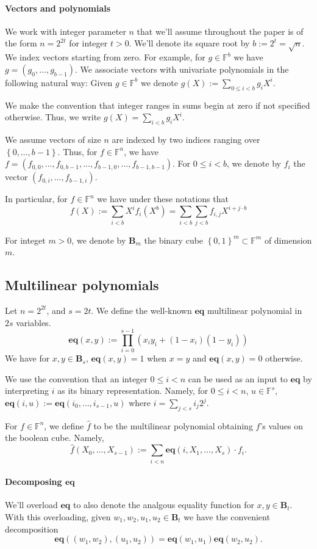 \documentclass[11pt]{article} %
\newcommand{\F}{\ensuremath{\mathbb F}\xspace}
\newcommand{\defeq}{:=}
\newcommand{\set}[1]{\ensuremath{\left\{#1\right\}}\xspace}
\newcommand{\sumi}[1]{\sum_{i< #1}}
\newcommand{\sumj}[1]{\sum_{j< #1}}
\newcommand{\eq}{\ensuremath{\mathsf{eq}}\xspace}
\renewcommand{\eq}{\ensuremath{\mathbf{eq}}\xspace}
\newcommand{\mle}[1]{\ensuremath{\hat{#1}}\xspace}
\newcommand{\B}[1]{\ensuremath{\mathbf{B}_{#1}}\xspace}
\begin{document}
\paragraph{Vectors and polynomials}
We work with integer parameter $n$ that we'll assume throughout the paper  is of the form
$n=2^{2t}$ for integer $t>0$. We'll denote its square root by $b\defeq 2^t=\sqrt{n}$.
We index vectors starting from zero. For example, for $g\in \F^b$ we have $g=(g_0,\ldots,g_{b-1})$.
We associate vectors with univariate polynomials in the following natural way:
Given $g\in \F^b$ we denote $g(X)\defeq \sum_{0\leq i < b} g_i X^i$.

We make the convention that integer ranges in sums begin at zero if not specified otherwise. Thus, we write
$g(X)=\sumi{b}g_i X^i$.

We assume vectors of size $n$ are indexed by two indices ranging over $\set{0,\ldots,b-1}$. Thus, for $f\in \F^n$, we have $f=(f_{0,0},\ldots,f_{0,b-1},\ldots,f_{b-1,0},\ldots,f_{b-1,b-1})$.
 For $0\leq i <b$, we denote by $f_i$ the vector $(f_{0,i},\ldots, f_{b-1,i})$.

In particular, for $f\in \F^n$ we have under these notations that
\[f(X)\defeq \sumi{b}X^i f_i(X^b) = \sumi{b}\sumj{b}f_{i,j}X^{i+j\cdot b}\]
 
For integet $m>0$, we denote by \B{m} the binary cube $\set{0,1}^m\subset \F^m$ of dimension $m$.
\subsection{Multilinear polynomials}\label{sec:multilin-polys}
Let $n=2^{2t}$, and $s=2t$.
We define the well-known \eq multilinear polynomial in $2s$ variables. 
\[\eq(x,y) \defeq \prod_{i=0}^{s-1} ( x_i y_i + (1-x_i)(1-y_i))\]
We have for $x,y \in \B{s}$, $\eq(x,y)=1$ when $x=y$ and $\eq(x,y)=0$ otherwise.

We use the convention that an integer $0\leq i < n$ can be used as an input to \eq by interpreting $i$ as its binary representation.
Namely, for $0\leq i <n$, $u\in \F^s$, $\eq(i,u)\defeq \eq(i_0,\ldots, i_{s-1},u)$ where $i=\sumj{s} i_j 2^{j}$.

For $f\in \F^n$, we define $\mle{f}$ to be the multilinear polynomial obtaining $f$'s values on the boolean cube.
Namely,
\[\mle{f}(X_0,\ldots,X_{s-1}) \defeq \sumi{n}\eq(i,X_1,\ldots,X_s)\cdot f_i.\]

\paragraph{Decomposing \eq}
We'll overload \eq to also denote the analgous equality function for $x,y \in \B{t}$.
With this overloading, given $w_1,w_2,u_1,u_2\in \B{t}$ we have the convenient decomposition
\[ \eq( (w_1,w_2),(u_1,u_2)) = \eq(w_1,u_1)\eq(w_2,u_2).\]
\end{document}
